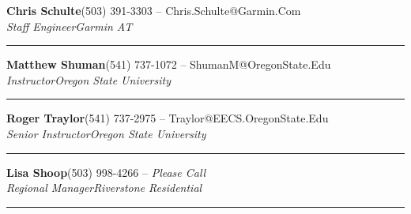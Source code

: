 \documentclass[margin, line]{res}
\newcommand{\ressubheading}[4]{
  \begin{minipage}{\textwidth}
  {\textbf{#1}\hfill #2} \\
  {\textit{#3}\hfill \textit{#4}}
  \end{minipage}
  \rule{\textwidth}{1pt}
  }
\begin{document}
    \ressubheading{Chris Schulte}
                  {(503) 391-3303 -- Chris.Schulte@Garmin.Com}
                  {Staff Engineer}
                  {Garmin AT}

    \ressubheading{Matthew Shuman}
                  {(541) 737-1072 -- ShumanM@OregonState.Edu}
                  {Instructor}
                  {Oregon State University} 

    \ressubheading{Roger Traylor}
                  {(541) 737-2975 -- Traylor@EECS.OregonState.Edu}
                  {Senior Instructor}
                  {Oregon State University}

    \ressubheading{Lisa Shoop}
                  {(503) 998-4266 -- {\it Please Call}}
                  {Regional Manager}
                  {Riverstone Residential}
\end{document}
